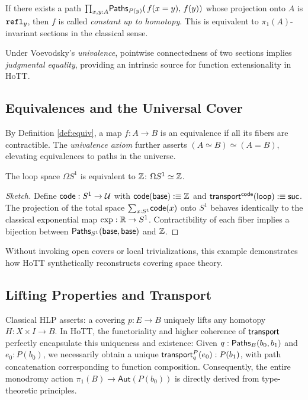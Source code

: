 \begin{definition}
  If there exists a path
  \(\textstyle\mathbf{\prod}_{x,y:A}\textsf{Paths}_{P(y)}\!\left\lparen \,f(x\mathrel{=}y),\,f(y) \right\rparen\)
  whose projection onto \(A\) is \(\texttt{refl}_y\), then \(f\) is called \emph{constant up to homotopy}. This is equivalent to \(\pi_1(A)\)-invariant sections in the classical sense.
\end{definition}

Under Voevodsky's \emph{univalence}, pointwise connectedness of two sections implies
\emph{judgmental equality}, providing an intrinsic source for function extensionality in HoTT.

\subsection{Equivalences and the Universal Cover}\label{sec:univalence}
By Definition \ref{def:equiv}, a map \(f:A\to B\) is an equivalence if all its fibers are contractible.
The \emph{univalence axiom} further asserts
\((A\simeq B)\simeq(A=B)\), elevating equivalences to paths in the universe.

\begin{theorem}\label{thm:omegaS1}
  The loop space \(\Omega S^1\) is equivalent to \(\mathbb{Z}\): \(\Omega S^1\simeq\mathbb{Z}\).
\end{theorem}

\begin{proof}[Sketch]
  Define \(\textsf{code}:S^1\to\mathcal{U}\) with
  \(\textsf{code}(\textsf{base}):\equiv\mathbb{Z}\) and
  \(\textsf{transport}^{\textsf{code}}(\textsf{loop}):\equiv\textsf{suc}\).
  The projection of the total space
  \(\textstyle\mathbf{\sum}_{x:S^1}\textsf{code}(x)\) onto \(S^1\) behaves identically to the classical exponential map
  \(\exp:\mathbb{R}\to S^1\).
  Contractibility of each fiber implies a bijection between
  \(\textsf{Paths}_{S^1}(\textsf{base},\textsf{base})\) and \(\mathbb{Z}\).
\end{proof}

Without invoking open covers or local trivializations, this example demonstrates how HoTT synthetically reconstructs covering space theory.

\subsection{Lifting Properties and Transport}\label{sec:lifting}
Classical HLP asserts: a covering \(p:E\to B\) uniquely lifts any homotopy
\(H:X\times I\to B\). In HoTT,
the functoriality and higher coherence of
\(\textsf{transport}\) perfectly encapsulate this uniqueness and existence:
Given \(q:\textsf{Paths}_B(b_0,b_1)\) and \(e_0:P(b_0)\),
we necessarily obtain a unique
\(\textsf{transport}^{P}_{q}(e_0):P(b_1)\),
with path concatenation corresponding to function composition.
Consequently, the entire monodromy action
\(\pi_1(B)\to\mathsf{Aut}(P(b_0))\)
is directly derived from type-theoretic principles.

